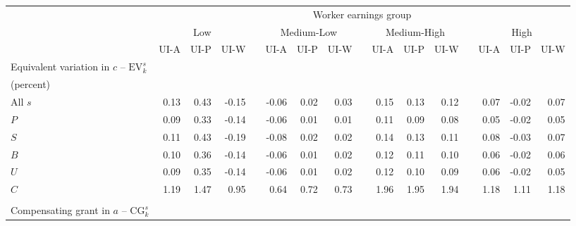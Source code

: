 \begin{tabular}{lrrrrrrrrrrrrrrr}
\toprule
      & \multicolumn{15}{c}{Worker earnings group} \\
\cmidrule{2-16}      & \multicolumn{3}{c}{Low} &       & \multicolumn{3}{c}{Medium-Low} &       & \multicolumn{3}{c}{Medium-High} &       & \multicolumn{3}{c}{High} \\
\cmidrule{2-4}\cmidrule{6-8}\cmidrule{10-12}\cmidrule{14-16}      & \multicolumn{1}{l}{UI-A} & \multicolumn{1}{l}{UI-P} & \multicolumn{1}{l}{UI-W} &       & \multicolumn{1}{l}{UI-A} & \multicolumn{1}{l}{UI-P} & \multicolumn{1}{l}{UI-W} &       & \multicolumn{1}{l}{UI-A} & \multicolumn{1}{l}{UI-P} & \multicolumn{1}{l}{UI-W} &       & \multicolumn{1}{l}{UI-A} & \multicolumn{1}{l}{UI-P} & \multicolumn{1}{l}{UI-W} \\
\midrule
Equivalent variation in $c$ -- $\text{EV}_k^s$ &       &       &       &       &       &       &       &       &       &       &       &       &       &       &  \\
(percent) &       &       &       &       &       &       &       &       &       &       &       &       &       &       &  \\
\quad All $s$ & 0.13  & 0.43  & -0.15 &       & -0.06 & 0.02  & 0.03  &       & 0.15  & 0.13  & 0.12  &       & 0.07  & -0.02 & 0.07 \\
\quad $P$ & 0.09  & 0.33  & -0.14 &       & -0.06 & 0.01  & 0.01  &       & 0.11  & 0.09  & 0.08  &       & 0.05  & -0.02 & 0.05 \\
\quad $S$ & 0.11  & 0.43  & -0.19 &       & -0.08 & 0.02  & 0.02  &       & 0.14  & 0.13  & 0.11  &       & 0.08  & -0.03 & 0.07 \\
\quad $B$ & 0.10  & 0.36  & -0.14 &       & -0.06 & 0.01  & 0.02  &       & 0.12  & 0.11  & 0.10  &       & 0.06  & -0.02 & 0.06 \\
\quad $U$ & 0.09  & 0.35  & -0.14 &       & -0.06 & 0.01  & 0.02  &       & 0.12  & 0.10  & 0.09  &       & 0.06  & -0.02 & 0.05 \\
\quad $C$ & 1.19  & 1.47  & 0.95  &       & 0.64  & 0.72  & 0.73  &       & 1.96  & 1.95  & 1.94  &       & 1.18  & 1.11  & 1.18 \\
      &       &       &       &       &       &       &       &       &       &       &       &       &       &       &  \\
Compensating grant in $a$ -- $\text{CG}_k^s$ &       &       &       &       &       &       &       &       &       &       &       &       &       &       &  \\

\end{tabular}
